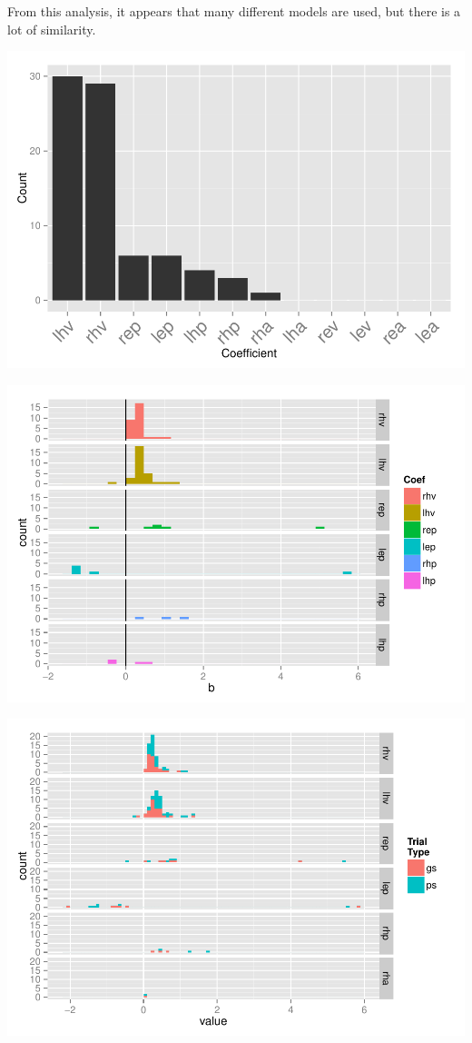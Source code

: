 \documentclass[]{article}
\begin{document}
From this analysis, it appears that many different models are used, but
there is a lot of similarity.

\includegraphics{NRGRecord_files/figure-latex/coefCounts-1.pdf}

\includegraphics{NRGRecord_files/figure-latex/hvCoefs-1.pdf}

\includegraphics{NRGRecord_files/figure-latex/gspdiff-1.pdf}
\end{document}
